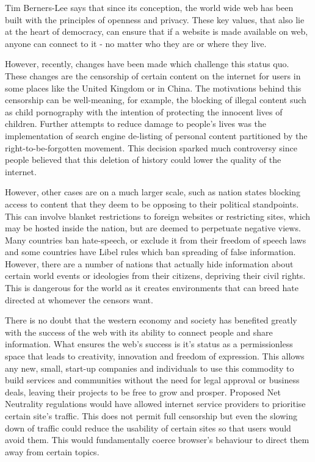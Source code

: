 \documentclass[12pt,a4paper]{article}
\begin{document}
Tim Berners-Lee says\cite{gard} that since its conception, the world wide web has been built with the principles of openness and privacy. These key values, that also lie at the heart of democracy, can ensure that if a website is made available on web, anyone can connect to it - no matter who they are or where they live. 

However, recently, changes have been made which challenge this status quo. These changes are the censorship of certain content on the internet for users in some places like the United Kingdom or in China. The motivations behind this censorship can be well-meaning, for example, the blocking of illegal content such as child pornography with the intention of protecting the innocent lives of children. Further attempts to reduce damage to people's lives was the implementation of search engine de-listing of personal content partitioned by the right-to-be-forgotten movement\cite{rtbf}. This decision sparked much controversy since people believed that this deletion of history could lower the quality of the internet. 

However, other cases are on a much larger scale, such as nation states blocking access to content that they deem to be opposing to their political standpoints. This can involve blanket restrictions to foreign websites or restricting sites, which may be hosted inside the nation, but are deemed to perpetuate negative views. Many countries ban hate-speech, or exclude it from their freedom of speech laws\cite{hate} and some countries have Libel rules\cite{libel} which ban spreading of false information. However, there are a number of nations that actually hide information about certain world events or ideologies from their citizens, depriving their civil rights\cite{chincensor}. This is dangerous for the world as it creates environments that can breed hate directed at whomever the censors want.

There is no doubt that the western economy and society has benefited greatly with the success of the web with its ability to connect people and share information. What ensures the web's success is it's status as a permissionless space that leads to creativity, innovation and freedom of expression. This allows any new, small, start-up companies and individuals to use this commodity to build services and communities without the need for legal approval or business deals, leaving their projects to be free to grow and prosper. Proposed Net Neutrality regulations would have allowed internet service providers to prioritise certain site's traffic. This does not permit full censorship but even the slowing down of traffic could reduce the usability of certain sites so that users would avoid them. This would fundamentally coerce browser's behaviour to direct them away from certain topics.
\end{document}

